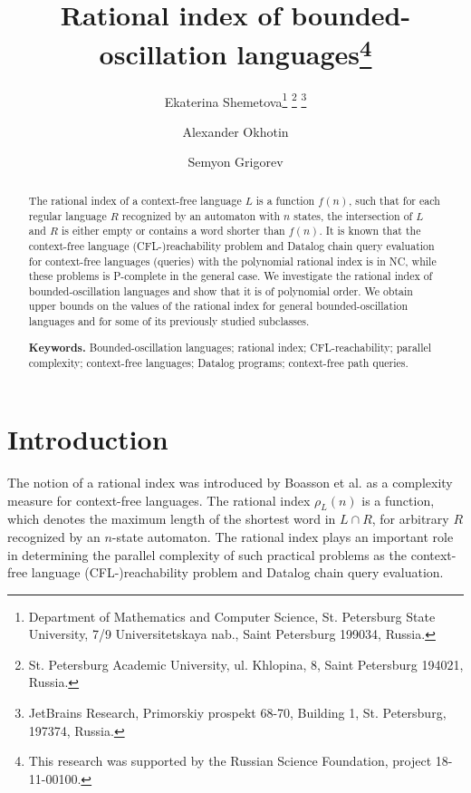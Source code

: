 \documentclass[11pt,a4paper]{article} %
\begin{document}
\sloppy

\title{Rational index of bounded-oscillation languages\footnote{%
This research was supported by the Russian Science Foundation, project 18-11-00100.}}

\author{Ekaterina Shemetova\footnote{%
Department of Mathematics and Computer Science, St. Petersburg State University, 
7/9 Universitetskaya nab., Saint Petersburg 199034, Russia.}
\footnote{%
St. Petersburg Academic University, 
ul. Khlopina, 8, Saint Petersburg 194021, Russia.}
\footnote{%
JetBrains Research,
Primorskiy prospekt 68-70, Building 1, St. Petersburg, 197374, Russia.}
\and
Alexander Okhotin\footnotemark[2]
\and
Semyon Grigorev\footnotemark[2] \footnotemark[4]
}

\maketitle


\begin{abstract}
The rational index of a context-free language  $L$ is a function $f(n)$, such that for each regular language $R$ recognized by an automaton with $n$ states, the intersection of $L$ and $R$ is either empty or contains a word shorter than $f(n)$. It is known that the context-free language (CFL-)reachability problem and Datalog chain query evaluation for context-free languages (queries) with the polynomial rational index is in NC, while these problems is P-complete in the general case. We investigate the rational index of bounded-oscillation languages and show that it is of polynomial order. We obtain upper bounds on the values of the rational index for general bounded-oscillation languages and for some of its previously studied subclasses.

\textbf{Keywords.}
Bounded-oscillation languages; rational index; CFL-reachability; parallel complexity; context-free languages; Datalog programs; context-free path queries.
\end{abstract}


\section{Introduction}
\label{intro}
The notion of a rational index was introduced by Boasson et al. \cite{RatBasic} as a complexity measure for context-free languages. The rational index $\rho_L(n)$ is a function, which denotes the maximum length of the shortest word in $L \cap R$, for arbitrary $R$ recognized by an $n$-state automaton. The rational index plays an important role in determining the parallel complexity of such practical problems as the context-free language (CFL-)reachability problem and Datalog chain query evaluation.
\end{document}
